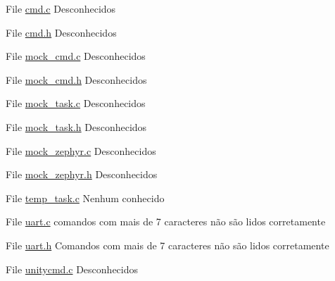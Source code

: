 
\begin{DoxyRefList}
\item[File \mbox{\hyperlink{cmd_8c}{cmd.c}} ]\label{bug__bug000003}%
%
Desconhecidos 
\item[File \mbox{\hyperlink{cmd_8h}{cmd.h}} ]\label{bug__bug000001}%
%
Desconhecidos 
\item[File \mbox{\hyperlink{mock__cmd_8c}{mock\+\_\+cmd.c}} ]\label{bug__bug000006}%
%
Desconhecidos  
\item[File \mbox{\hyperlink{mock__cmd_8h}{mock\+\_\+cmd.h}} ]\label{bug__bug000007}%
%
Desconhecidos  
\item[File \mbox{\hyperlink{mock__task_8c}{mock\+\_\+task.c}} ]\label{bug__bug000008}%
%
Desconhecidos  
\item[File \mbox{\hyperlink{mock__task_8h}{mock\+\_\+task.h}} ]\label{bug__bug000009}%
%
Desconhecidos  
\item[File \mbox{\hyperlink{mock__zephyr_8c}{mock\+\_\+zephyr.c}} ]\label{bug__bug000010}%
%
Desconhecidos  
\item[File \mbox{\hyperlink{mock__zephyr_8h}{mock\+\_\+zephyr.h}} ]\label{bug__bug000011}%
%
Desconhecidos 
\item[File \mbox{\hyperlink{temp__task_8c}{temp\+\_\+task.c}} ]\label{bug__bug000004}%
%
Nenhum conhecido  
\item[File \mbox{\hyperlink{uart_8c}{uart.c}} ]\label{bug__bug000005}%
%
comandos com mais de 7 caracteres não são lidos corretamente 
\item[File \mbox{\hyperlink{uart_8h}{uart.h}} ]\label{bug__bug000002}%
%
Comandos com mais de 7 caracteres não são lidos corretamente 
\item[File \mbox{\hyperlink{unitycmd_8c}{unitycmd.c}} ]\label{bug__bug000012}%
%
Desconhecidos
\end{DoxyRefList}